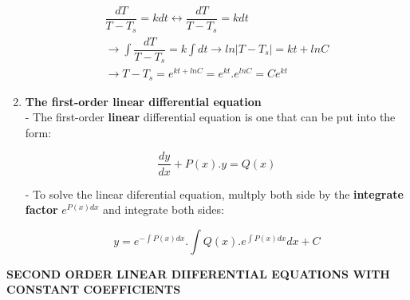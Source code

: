 \documentclass[10pt]{article}
\begin{document}
\begin{enumerate}
\begin{center}
	\begin{align}
	\dfrac{dT}{T-T_s} = kdt \leftrightarrow \dfrac{dT}{T-T_s} = kdt \\
	\rightarrow \displaystyle \int \dfrac{dT}{T-T_s} = k \int dt \rightarrow ln|T-T_s| = kt + lnC \\
	\rightarrow T -T_s = e^{kt + lnC} = e^{kt}.e^{lnC} = Ce^{kt}
	\end{align}
	\end{center}
	\item \textbf{The first-order linear differential equation}\\
	- The first-order \textbf{linear} differential equation is one that can be put into the form:
	\begin{mybox}
	\begin{center}
	\begin{equation}
	\dfrac{dy}{dx} + P(x).y = Q(x)
	\end{equation}
	\end{center}
	\end{mybox}
	- To solve the linear diferential equation, multply both side by the \textbf{integrate factor} $e^{P(x)dx}$ and integrate both sides:
	\begin{mybox}
	\begin{center}
	\begin{equation}
	y = e^{- \int P(x)dx}.{\displaystyle \int Q(x).e^{\int P(x)dx}dx + C}
	\end{equation}
	\end{center}
	\end{mybox}
\end{enumerate}
\pagebreak
\begin{center}
\textbf{SECOND ORDER LINEAR DIIFERENTIAL EQUATIONS WITH CONSTANT COEFFICIENTS}
\end{center}
\end{document}
